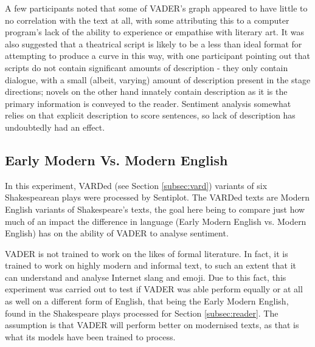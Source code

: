\documentclass{article}
\begin{document}
{                A few participants noted that some of VADER's graph appeared to have little to no correlation with the text at all, with some attributing this to a computer program's lack of the ability to experience or empathise with literary art. It was also suggested that a theatrical script is likely to be a less than ideal format for attempting to produce a curve in this way, with one participant pointing out that scripts do not contain significant amounts of description - they only contain dialogue, with a small (albeit, varying) amount of description present in the stage directions; novels on the other hand innately contain description as it is the primary information is conveyed to the reader. Sentiment analysis somewhat relies on that explicit description to score sentences, so lack of description has undoubtedly had an effect.
    \subsection{Early Modern Vs. Modern English}
    \label{subsec:EMvME}
        In this experiment, VARDed (see Section \ref{subsec:vard}) variants of six Shakespearean plays were processed by Sentiplot. The VARDed texts are Modern English variants of Shakespeare's texts, the goal here being to compare just how much of an impact the difference in language (Early Modern English vs. Modern English) has on the ability of VADER to analyse sentiment.

        VADER is not trained to work on the likes of formal literature. In fact, it is trained to work on highly modern and informal text, to such an extent that it can understand and analyse Internet slang and emoji. Due to this fact, this experiment was carried out to test if VADER was able perform equally or at all as well on a different form of English, that being the Early Modern English, found in the Shakespeare plays processed for Section \ref{subsec:reader}. The assumption is that VADER will perform better on modernised texts, as that is what its models have been trained to process.
        
}
\end{document}
